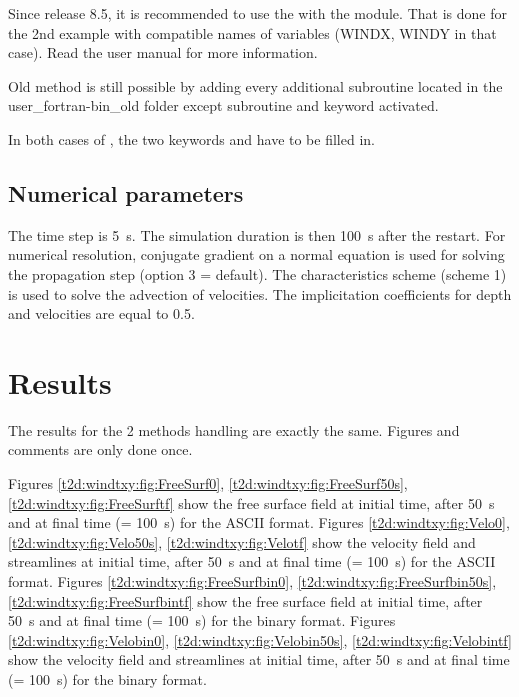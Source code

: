 Since release 8.5, it is recommended to use the
 with the  module.
That is done for the 2nd example with compatible names of variables
(WINDX, WINDY in that case).
Read the  user manual for more information.

Old method is still possible by adding every additional subroutine located
in the user\_fortran-bin\_old folder except  subroutine
and keyword  activated.

In both cases of , the two keywords
 and  have to be
filled in.

\subsection{Numerical parameters}

The time step is 5~s. The simulation duration is then 100~s after the restart.
For numerical resolution, conjugate gradient on a normal equation 
is used for solving the propagation step (option 3 = default).
The characteristics scheme (scheme 1) is used to solve the advection of velocities.
The implicitation coefficients for depth and velocities are equal to 0.5.

\section{Results}

The results for the 2 methods handling 
are exactly the same.
Figures and comments are only done once.

Figures \ref{t2d:windtxy:fig:FreeSurf0}, \ref{t2d:windtxy:fig:FreeSurf50s},
\ref{t2d:windtxy:fig:FreeSurftf} show the free surface field at initial time,
after 50~s and at final time (= 100~s) for the ASCII format.
Figures \ref{t2d:windtxy:fig:Velo0}, \ref{t2d:windtxy:fig:Velo50s},
\ref{t2d:windtxy:fig:Velotf} show the velocity field and streamlines
at initial time, after 50~s and at final time (= 100~s) for the ASCII format.
Figures \ref{t2d:windtxy:fig:FreeSurfbin0}, \ref{t2d:windtxy:fig:FreeSurfbin50s},
\ref{t2d:windtxy:fig:FreeSurfbintf} show the free surface field at initial time,
after 50~s and at final time (= 100~s) for the binary format.
Figures \ref{t2d:windtxy:fig:Velobin0}, \ref{t2d:windtxy:fig:Velobin50s},
\ref{t2d:windtxy:fig:Velobintf} show the velocity field and streamlines at
initial time, after 50~s and at final time (= 100~s) for the binary format.

